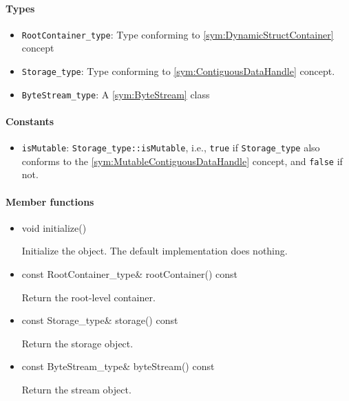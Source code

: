 \paragraph{Types}

\begin{itemize}
	\item \texttt{RootContainer\_type}: Type conforming to \ref{sym:DynamicStructContainer} concept
	\item \texttt{Storage\_type}: Type conforming to \ref{sym:ContiguousDataHandle} concept.
	\item \texttt{ByteStream\_type}: A \ref{sym:ByteStream} class
\end{itemize}

\paragraph{Constants}

\begin{itemize}
	\item \texttt{isMutable}: \texttt{Storage\_type::isMutable}, i.e., \texttt{true} if \texttt{Storage\_type} also conforms to the \ref{sym:MutableContiguousDataHandle} concept, and \texttt{false} if not.
\end{itemize}

\paragraph{Member functions}

\begin{itemize}
	\item
		\begin{cppsnippet}
		void initialize()
		\end{cppsnippet}

		Initialize the object. The default implementation does nothing.

	\item
		\begin{cppsnippet}
		const RootContainer_type& rootContainer() const
		\end{cppsnippet}
		
		Return the root-level container.

	\item
		\begin{cppsnippet}
		const Storage_type& storage() const
		\end{cppsnippet}
		
		Return the storage object.

	\item
		\begin{cppsnippet}
		const ByteStream_type& byteStream() const
		\end{cppsnippet}
		
		Return the stream object.
\end{itemize}

